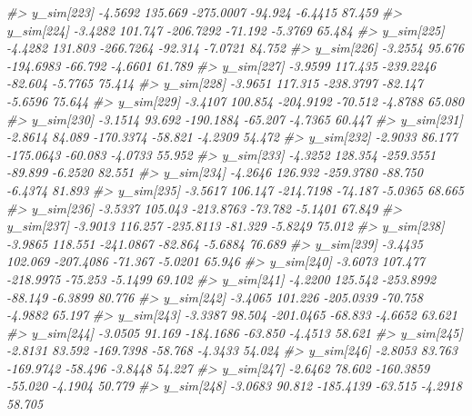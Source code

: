 \documentclass[
  10pt,
  italian,
  a4paper,
  extrafontsizes,onecolumn,openright
  ]{memoir}
\newenvironment{Shaded}{\begin{snugshade}}{\end{snugshade}}
\newcommand{\CommentTok}[1]{\textcolor[rgb]{0.56,0.35,0.01}{\textit{#1}}}
\begin{document}
\begin{Shaded}
\begin{Highlighting}[]
\CommentTok{\#\textgreater{}   y\_sim[223] {-}4.5692 135.669 {-}275.0007 {-}94.924 {-}6.4415 87.459}
\CommentTok{\#\textgreater{}   y\_sim[224] {-}3.4282 101.747 {-}206.7292 {-}71.192 {-}5.3769 65.484}
\CommentTok{\#\textgreater{}   y\_sim[225] {-}4.4282 131.803 {-}266.7264 {-}92.314 {-}7.0721 84.752}
\CommentTok{\#\textgreater{}   y\_sim[226] {-}3.2554  95.676 {-}194.6983 {-}66.792 {-}4.6601 61.789}
\CommentTok{\#\textgreater{}   y\_sim[227] {-}3.9599 117.435 {-}239.2246 {-}82.604 {-}5.7765 75.414}
\CommentTok{\#\textgreater{}   y\_sim[228] {-}3.9651 117.315 {-}238.3797 {-}82.147 {-}5.6596 75.644}
\CommentTok{\#\textgreater{}   y\_sim[229] {-}3.4107 100.854 {-}204.9192 {-}70.512 {-}4.8788 65.080}
\CommentTok{\#\textgreater{}   y\_sim[230] {-}3.1514  93.692 {-}190.1884 {-}65.207 {-}4.7365 60.447}
\CommentTok{\#\textgreater{}   y\_sim[231] {-}2.8614  84.089 {-}170.3374 {-}58.821 {-}4.2309 54.472}
\CommentTok{\#\textgreater{}   y\_sim[232] {-}2.9033  86.177 {-}175.0643 {-}60.083 {-}4.0733 55.952}
\CommentTok{\#\textgreater{}   y\_sim[233] {-}4.3252 128.354 {-}259.3551 {-}89.899 {-}6.2520 82.551}
\CommentTok{\#\textgreater{}   y\_sim[234] {-}4.2646 126.932 {-}259.3780 {-}88.750 {-}6.4374 81.893}
\CommentTok{\#\textgreater{}   y\_sim[235] {-}3.5617 106.147 {-}214.7198 {-}74.187 {-}5.0365 68.665}
\CommentTok{\#\textgreater{}   y\_sim[236] {-}3.5337 105.043 {-}213.8763 {-}73.782 {-}5.1401 67.849}
\CommentTok{\#\textgreater{}   y\_sim[237] {-}3.9013 116.257 {-}235.8113 {-}81.329 {-}5.8249 75.012}
\CommentTok{\#\textgreater{}   y\_sim[238] {-}3.9865 118.551 {-}241.0867 {-}82.864 {-}5.6884 76.689}
\CommentTok{\#\textgreater{}   y\_sim[239] {-}3.4435 102.069 {-}207.4086 {-}71.367 {-}5.0201 65.946}
\CommentTok{\#\textgreater{}   y\_sim[240] {-}3.6073 107.477 {-}218.9975 {-}75.253 {-}5.1499 69.102}
\CommentTok{\#\textgreater{}   y\_sim[241] {-}4.2200 125.542 {-}253.8992 {-}88.149 {-}6.3899 80.776}
\CommentTok{\#\textgreater{}   y\_sim[242] {-}3.4065 101.226 {-}205.0339 {-}70.758 {-}4.9882 65.197}
\CommentTok{\#\textgreater{}   y\_sim[243] {-}3.3387  98.504 {-}201.0465 {-}68.833 {-}4.6652 63.621}
\CommentTok{\#\textgreater{}   y\_sim[244] {-}3.0505  91.169 {-}184.1686 {-}63.850 {-}4.4513 58.621}
\CommentTok{\#\textgreater{}   y\_sim[245] {-}2.8131  83.592 {-}169.7398 {-}58.768 {-}4.3433 54.024}
\CommentTok{\#\textgreater{}   y\_sim[246] {-}2.8053  83.763 {-}169.9742 {-}58.496 {-}3.8448 54.227}
\CommentTok{\#\textgreater{}   y\_sim[247] {-}2.6462  78.602 {-}160.3859 {-}55.020 {-}4.1904 50.779}
\CommentTok{\#\textgreater{}   y\_sim[248] {-}3.0683  90.812 {-}185.4139 {-}63.515 {-}4.2918 58.705}

\end{Highlighting}
\end{Shaded}
\end{document}
